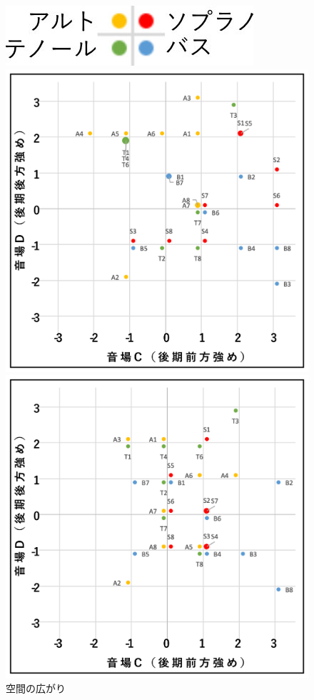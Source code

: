 \documentclass[11pt,a4j]{jreport}
\begin{document}
\begin{figure}[H]
  \begin{minipage}{1\linewidth}
    \centering
    \includegraphics[scale=.7]{images/subjectiveExp/scat_0_legend.jpg}
  \end{minipage}

  \begin{minipage}{0.5\linewidth}
    \centering
    \includegraphics[width=.9\linewidth]{images/subjectiveExp/scat_late_04spacy.png}
    \caption*{空間の広がり}
  \end{minipage}%
  \begin{minipage}{0.5\linewidth}
    \centering
    \includegraphics[width=.9\linewidth]{images/subjectiveExp/scat_late_05audience.png}

\end{minipage}
\end{figure}
\end{document}
